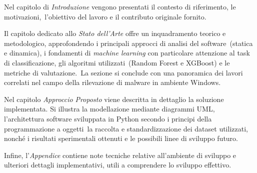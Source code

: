 Nel capitolo di \textit{Introduzione} vengono presentati il contesto di riferimento, le motivazioni,\
l'obiettivo del lavoro e il contributo originale fornito.

Il capitolo dedicato allo \textit{Stato dell’Arte} offre un inquadramento teorico e metodologico, approfondendo i principali approcci di analisi del software\
(statica e dinamica), i fondamenti di \textit{machine learning} con particolare attenzione al task di classificazione, gli algoritmi utilizzati\
(Random Forest e XGBoost) e le metriche di valutazione.\
La sezione si conclude con una panoramica dei lavori correlati nel campo della rilevazione di malware in ambiente Windows.

Nel capitolo \textit{Approccio Proposto} viene descritta in dettaglio la soluzione implementata.
Si illustra la modellazione mediante diagrammi UML, l'architettura software sviluppata in Python secondo i principi della programmazione a oggetti\
la raccolta e standardizzazione dei dataset utilizzati, nonché i risultati sperimentali ottenuti e le possibili linee di sviluppo futuro.

Infine, l'\textit{Appendice} contiene note tecniche relative all'ambiente di sviluppo e ulteriori dettagli implementativi, utili a
comprendere lo sviluppo effettivo.
